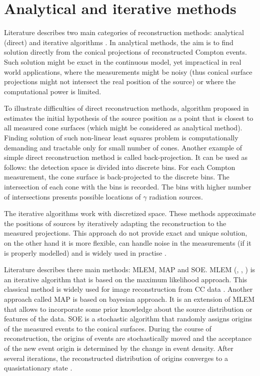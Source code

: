 \section{Analytical and iterative methods}
Literature describes two main categories of reconstruction methods: analytical (direct) and iterative algorithms \cite{lojacono2}.
In analytical methods, the aim is to find solution directly from the conical projections of reconstructed Compton events.
Such solution might be exact in the continuous model, yet impractical in real world applications, where the measurements might be noisy (thus conical surface projections might not intersect the real position of the source) or where the computational power is limited.

To illustrate difficulties of direct reconstruction methods, algorithm proposed in \cite{baca2021gamma} estimates the initial hypothesis of the source position as a point that is closest to all measured cone surfaces (which might be considered as analytical method).
Finding solution of such non-linear least squares problem is computationally demanding and tractable only for small number of cones.
Another example of simple direct reconstruction method is called back-projection.
It can be used as follows:
the detection space is divided into discrete bins.
For each Compton measurement, the cone surface is back-projected to the discrete bins.
The intersection of each cone with the bins is recorded.
The bins with higher number of intersections presents possible locations of $\gamma$ radiation sources.

The iterative algorithms work with discretized space.
These methods  approximate the positions of sources by iteratively adapting the reconstruction to the measured projections.
This approach do not provide exact and unique solution, on the other hand it is more flexible, can handle noise in the measurements (if it is properly modelled) and is widely used in practise \cite{lojacono2}.

Literature describes there main methods: \ac{MLEM}, \ac{MAP} and \ac{SOE}.
\ac{MLEM} (\cite{MLEM_Shepp_1982}, \cite{MLEM_Lange_Carlson_1984}, \cite{MLEM_Wilderman_2000}) is an iterative algorithm that is based on the maximum likelihood approach.
This classical method is widely used for image reconstruction from \ac{CC} data \cite{maxim2016}.
Another approach called \ac{MAP} \cite{MLEM_Lange_Carlson_1984} is based on bayesian approach.
It is an extension of \ac{MLEM} that allows to incorporate some prior knowledge about the source distribution or features of the data.
\ac{SOE} is a stochastic algorithm that randomly assigns origins of the measured events to the conical surfaces.
During the course of reconstruction, the origins of events are stochastically moved and the acceptance of the new event origin is determined by the change in event density.
After several iterations, the reconstructed distribution of origins converges to a quasistationary state \cite{SOE_Andreyev_2009}.

